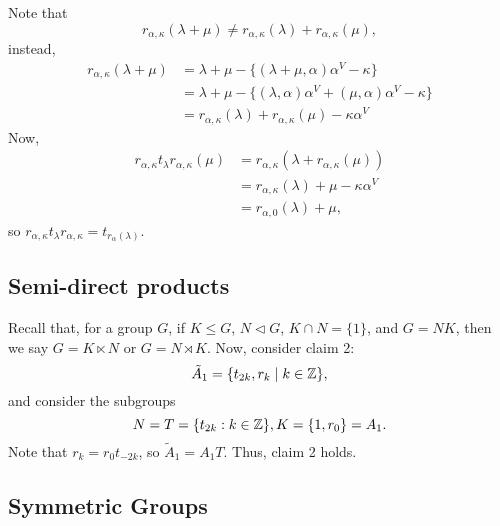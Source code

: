 Note that
\[
    r_{\alpha,\kappa}(\lambda + \mu) \neq r_{\alpha,\kappa}(\lambda)
    + r_{\alpha,\kappa}(\mu),
\]
instead,
\begin{align*}
    r_{\alpha, \kappa} (\lambda+\mu)
    &= \lambda + \mu - \{(\lambda + \mu, \alpha) \alpha^V - \kappa\} \\
    &= \lambda + \mu - \{(\lambda, \alpha) \alpha^V + (\mu, \alpha) \alpha^V - \kappa\} \\
    &= r_{\alpha,\kappa}(\lambda) + r_{\alpha, \kappa}(\mu) - \kappa \alpha^V
\end{align*}
Now,
\begin{align*}
    r_{\alpha,\kappa} t_{\lambda} r_{\alpha, \kappa}(\mu)
    &= r_{\alpha, \kappa}(\lambda + r_{\alpha, \kappa}(\mu)) \\
    &= r_{\alpha, \kappa}(\lambda) + \mu - \kappa \alpha^V \\
    &= r_{\alpha,0}(\lambda) + \mu,
\end{align*}
so $r_{\alpha, \kappa} t_\lambda r_{\alpha, \kappa} = t_{r_\alpha(\lambda)}$.
\\

\subsection{Semi-direct products}

Recall that, for a group $G$, if $K \leq G$, $N \triangleleft G$,
$K \cap N = \{1\}$, and $G = NK$,
then we say $G = K \ltimes N$ or $G = N \rtimes K$.
Now, consider claim 2:
\[
    \tilde{A}_1 = \{t_{2k}, r_k \mid k \in \mathbb{Z}\},
\]
and consider the subgroups
\[
    N = T = \{t_{2k} : k \in \mathbb{Z}\}, K = \{1, r_0\} = A_1.
\]
Note that $r_k = r_0 t_{-2k}$, so $\tilde{A}_1 = A_1T$. Thus, claim 2 holds.

\subsection{Symmetric Groups}


